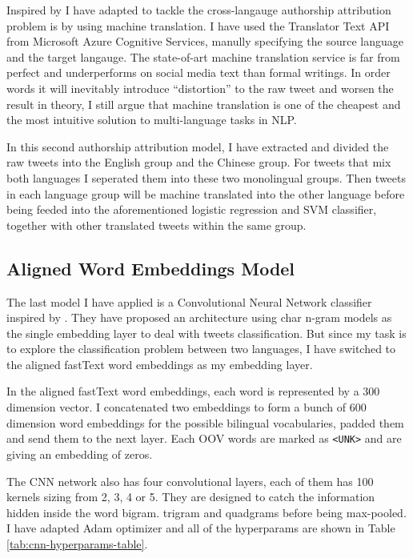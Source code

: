 \documentclass[11pt,a4paper]{article}
\begin{document}
Inspired by \citet{bogdanova2014cross} I have adapted to tackle the cross-langauge authorship attribution problem is by using machine translation. I have used the Translator Text API from Microsoft Azure Cognitive Services, manully specifying the source language and the target langauge. The state-of-art machine translation service is far from perfect and underperforms on social media text than formal writings. In order words it will inevitably introduce ``distortion'' to the raw tweet and worsen the result in theory, I still argue that machine translation is one of the cheapest and the most intuitive solution to multi-language tasks in NLP.

In this second authorship attribution model, I have extracted and divided the raw tweets into the English group and the Chinese group. For tweets that mix both languages I seperated them into these two monolingual groups. Then tweets in each language group will be machine translated into the other language before being feeded into the aforementioned logistic regression and SVM classifier, together with other translated tweets within the same group.

\subsection{Aligned Word Embeddings Model}

The last model I have applied is a Convolutional Neural Network classifier inspired by \citet{shrestha2017convolutional}. They have proposed an architecture using char n-gram models as the single embedding layer to deal with tweets classification. But since my task is to explore the classification problem between two languages, I have switched to the aligned fastText word embeddings \cite{bojanowski2017enriching} \cite{joulin2018loss} as my embedding layer.

In the aligned fastText word embeddings, each word is represented by a 300 dimension vector. I concatenated two embeddings to form a bunch of 600 dimension word embeddings for the possible bilingual vocabularies, padded them and send them to the next layer. Each OOV words are marked as \verb|<UNK>| and are giving an embedding of zeros.

The CNN network also has four convolutional layers, each of them has 100 kernels sizing from 2, 3, 4 or 5. They are designed to catch the information hidden inside the word bigram. trigram and quadgrams before being max-pooled. I have adapted Adam optimizer \cite{kingma2014adam} and all of the hyperparams are shown in Table \ref{tab:cnn-hyperparams-table}.
\end{document}
